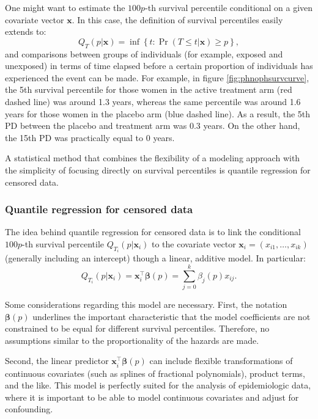 One might want to estimate the $100p$-th survival percentile conditional on a given covariate vector $\mathbf{x}$. In this case, the definition of survival percentiles easily extends to:
\begin{equation*}
Q_{T}(p|\mathbf{x}) =  \inf \left\{ t: \Pr\left(T \le t|\mathbf{x}\right) \ge p \right\},
\end{equation*}
and comparisons between groups of individuals (for example, exposed and unexposed) in terms of time elapsed before a certain proportion of individuals has experienced the event can be made. For example, in figure \ref{fig:phnophsurvcurve}, the 5th survival percentile for those women in the active treatment arm (red dashed line) was around 1.3 years, whereas the same percentile was around 1.6 years for those women in the placebo arm (blue dashed line). As a result, the 5th PD between the placebo and treatment arm was 0.3 years. On the other hand, the 15th PD was practically equal to 0 years.

A statistical method that combines the flexibility of a modeling approach with the simplicity of focusing directly on survival percentiles is quantile regression for censored data. 

\subsubsection{Quantile regression for censored data}

The idea behind quantile regression for censored data is to link the conditional $100p$-th survival percentile $Q_{T_i}(p|\mathbf{x}_i)$ to the covariate vector $\mathbf{x}_i=\left(x_{i1},\ldots,x_{ik}\right)$ (generally including an intercept) though a linear, additive model. In particular:
\begin{equation}
Q_{T_i}(p|\mathbf{x}_i) = \mathbf{x}_i^\top\boldsymbol{\beta}(p) = \sum_{j=0}^k \beta_j(p)  x_{ij}.
\label{eq:quantilemod}
\end{equation}

Some considerations regarding this model are necessary. First, the notation $\boldsymbol{\beta}(p)$ underlines the important characteristic that the model coefficients are not constrained to be equal for different survival percentiles. Therefore, no assumptions similar to the proportionality of the hazards are made.

Second, the linear predictor $\mathbf{x}_i^\top\boldsymbol{\beta}(p)$ can include flexible transformations of continuous covariates (such as splines of fractional polynomials), product terms, and the like. This model is perfectly suited for the analysis of epidemiologic data, where it is important to be able to model continuous covariates and adjust for confounding. 

